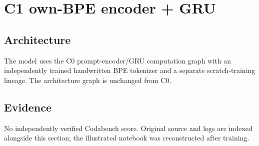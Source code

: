 \section{C1 own-BPE encoder + GRU}
\subsection{Architecture} The model uses the C0 prompt-encoder/GRU computation graph with an independently trained handwritten BPE tokenizer and a separate scratch-training lineage. The architecture graph is unchanged from C0.
\subsection{Evidence} No independently verified Codabench score. Original source and logs are indexed alongside this section; the illustrated notebook was reconstructed after training.

